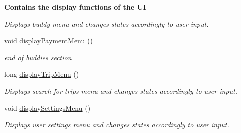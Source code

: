 \begin{Indent}{\bf Contains the display functions of the U\+I}
\begin{DoxyCompactItemize}
\begin{DoxyCompactList}\small\item\em Displays buddy menu and changes states accordingly to user input. \end{DoxyCompactList}\item 
void \hyperlink{class_lyfter_a81ff33cecdd84e8816e6147491b399ee}{display\+Payment\+Menu} ()
\begin{DoxyCompactList}\small\item\em end of buddies section \end{DoxyCompactList}\item 
\hypertarget{class_lyfter_a9831b8942eb1a1bea143b7d066fad9ec}{long \hyperlink{class_lyfter_a9831b8942eb1a1bea143b7d066fad9ec}{display\+Trip\+Menu} ()}\label{class_lyfter_a9831b8942eb1a1bea143b7d066fad9ec}

\begin{DoxyCompactList}\small\item\em Displays search for trips menu and changes states accordingly to user input. \end{DoxyCompactList}\item 
\hypertarget{class_lyfter_a1d5004c8609000cb802466a3392e9a0e}{void \hyperlink{class_lyfter_a1d5004c8609000cb802466a3392e9a0e}{display\+Settings\+Menu} ()}\label{class_lyfter_a1d5004c8609000cb802466a3392e9a0e}

\begin{DoxyCompactList}\small\item\em Displays user settings menu and changes states accordingly to user input. \end{DoxyCompactList}\end{DoxyCompactItemize}
\end{Indent}
